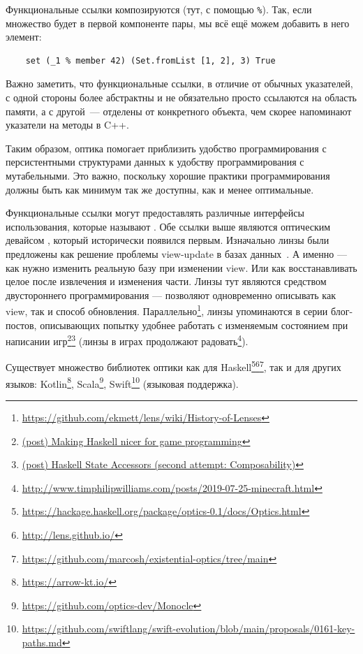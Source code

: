 Функциональные ссылки композируются (тут, с помощью \texttt{\%}).
Так, если множество будет в первой компоненте пары, мы всё ещё можем добавить в него элемент:
\begin{verbatim}
    set (_1 % member 42) (Set.fromList [1, 2], 3) True
\end{verbatim}

Важно заметить, что функциональные ссылки, в отличие от обычных указателей, с одной стороны более абстрактны и не обязательно просто ссылаются на область памяти, а с другой~--- отделены от конкретного объекта, чем скорее напоминают указатели на методы в C++.

Таким образом, оптика помогает приблизить удобство программирования с персистентными структурами данных к удобству программирования с мутабельными.
Это важно, поскольку хорошие практики программирования должны быть как минимум так же доступны, как и менее оптимальные.

Функциональные ссылки могут предоставлять различные интерфейсы использования, которые называют .
Обе ссылки выше являются оптическим девайсом , который исторически появился первым.
Изначально линзы были предложены как решение проблемы view-update в базах данных~\cite{bohannon2006relational, foster2008quotient}.
А именно --- как нужно изменить реальную базу при изменении view.
Или как восстанавливать целое после извлечения и изменения части.
Линзы тут являются средством двустороннего программирования --- позволяют одновременно описывать как view, так и способ обновления.
Параллельно\footnote{\url{https://github.com/ekmett/lens/wiki/History-of-Lenses}}, линзы упоминаются в серии блог-постов, описывающих попытку удобнее работать с изменяемым состоянием при написании игр\footnote{\href{https://web.archive.org/web/20140402193032/https://lukepalmer.wordpress.com/2007/07/26/making-haskell-nicer-for-game-programming/}{(post) Making Haskell nicer for game programming}}\footnote{\href{https://web.archive.org/web/20120303223802/https://lukepalmer.wordpress.com/2007/08/05/haskell-state-accessors-second-attempt-composability/}{(post) Haskell State Accessors (second attempt: Composability)}} (линзы в играх продолжают радовать\footnote{\url{http://www.timphilipwilliams.com/posts/2019-07-25-minecraft.html}}).

Существует множество библиотек оптики как для Haskell\footnote{\url{https://hackage.haskell.org/package/optics-0.1/docs/Optics.html}}\footnote{\url{http://lens.github.io/}}\footnote{\url{https://github.com/marcosh/existential-optics/tree/main}}, так и для других языков: Kotlin\footnote{\url{https://arrow-kt.io/}}, Scala\footnote{\url{https://github.com/optics-dev/Monocle}}, Swift\footnote{\url{https://github.com/swiftlang/swift-evolution/blob/main/proposals/0161-key-paths.md}} (языковая поддержка).

